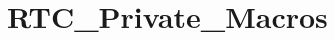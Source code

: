 \hypertarget{group___r_t_c___private___macros}{}\section{R\+T\+C\+\_\+\+Private\+\_\+\+Macros}
\label{group___r_t_c___private___macros}
